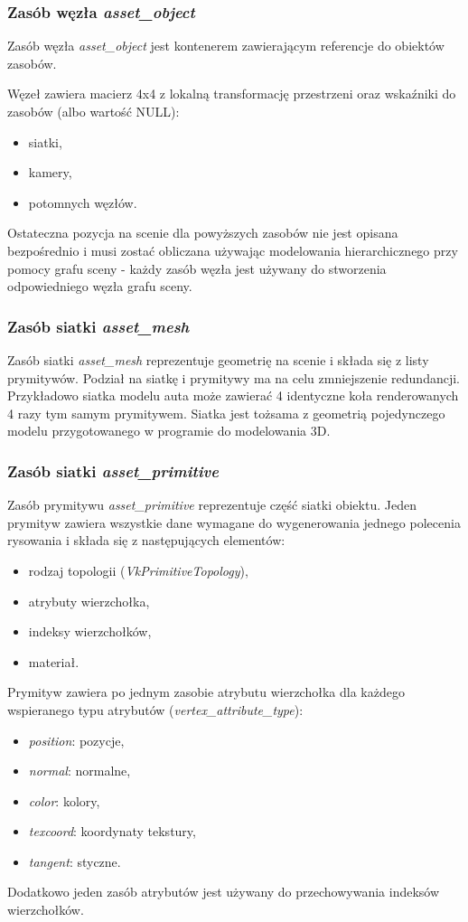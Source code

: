 \subsubsection{Zasób węzła \textit{asset\_object}}
Zasób węzła \textit{asset\_object} jest kontenerem zawierającym referencje do obiektów zasobów.

Węzeł zawiera macierz 4x4 z lokalną transformację przestrzeni oraz wskaźniki do zasobów (albo wartość NULL):
\begin{itemize}
	\item siatki,
	\item kamery,
	\item potomnych węzłów.
\end{itemize}
Ostateczna pozycja na scenie dla powyższych zasobów nie jest opisana bezpośrednio i musi zostać obliczana używając modelowania hierarchicznego przy pomocy grafu sceny - każdy zasób węzła jest używany do stworzenia odpowiedniego węzła grafu sceny.

\subsubsection{Zasób siatki \textit{asset\_mesh}}
Zasób siatki \textit{asset\_mesh} reprezentuje geometrię na scenie i składa się z listy prymitywów.
Podział na siatkę i prymitywy ma na celu zmniejszenie redundancji. Przykładowo siatka modelu auta może zawierać 4 identyczne koła renderowanych 4 razy tym samym prymitywem.
Siatka jest tożsama z geometrią pojedynczego modelu przygotowanego w programie do modelowania 3D.

\subsubsection{Zasób siatki \textit{asset\_primitive}}
Zasób prymitywu \textit{asset\_primitive} reprezentuje część siatki obiektu.
Jeden prymityw zawiera wszystkie dane wymagane do wygenerowania jednego polecenia rysowania i składa się z następujących elementów:
\begin{itemize}
	\item rodzaj topologii (\textit{VkPrimitiveTopology}),
	\item atrybuty wierzchołka,
	\item indeksy wierzchołków,
	\item materiał.
\end{itemize}

Prymityw zawiera po jednym zasobie atrybutu wierzchołka dla każdego wspieranego typu atrybutów (\textit{vertex\_attribute\_type}):
\begin{itemize}
	\item \textit{position}: pozycje,
	\item \textit{normal}: normalne,
	\item \textit{color}: kolory,
	\item \textit{texcoord}: koordynaty tekstury,
	\item \textit{tangent}: styczne.
\end{itemize}
Dodatkowo jeden zasób atrybutów jest używany do przechowywania indeksów wierzchołków.

